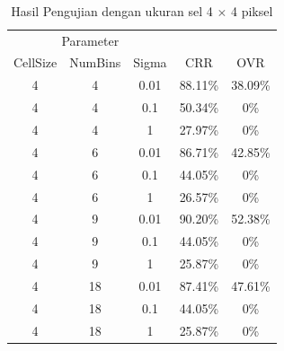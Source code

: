 \\
\\
\\
\\
\\
\\
\\
\\
\begin{longtable}[c]{|c|c|c|c|c|}
	\caption{Hasil Pengujian dengan ukuran sel 4 $\times$ 4 piksel}
	\label{tab:HasilPengujianSel4}\\
	\hline
	\multicolumn{3}{|c|}{Parameter} &                                &                                \\ \cline{1-3}
	CellSize   & NumBins   & Sigma  & \multirow{-2}{*}{CRR}          & \multirow{-2}{*}{OVR}          \\ \hline
	\endhead
	4          & 4         & 0.01   & 88.11\%                        & 38.09\% \\ \hline
	4          & 4         & 0.1    & 50.34\%                        & 0\%                            \\ \hline
	4          & 4         & 1      & 27.97\%                        & 0\%                            \\ \hline
	4          & 6         & 0.01   & 86.71\%                        & 42.85\%                         \\ \hline
	4          & 6         & 0.1    & 44.05\%                        & 0\%                            \\ \hline
	4          & 6         & 1      & 26.57\%                        & 0\%                            \\ \hline
	4          & 9         & 0.01   & {\color[HTML]{FE0000} 90.20\%} & {\color[HTML]{FE0000} 52.38\%} \\ \hline
	4          & 9         & 0.1    & 44.05\%                        & 0\%                            \\ \hline
	4          & 9         & 1      & 25.87\%                        & 0\%                            \\ \hline
	4          & 18        & 0.01   & 87.41\%                        & 47.61\%                         \\ \hline
	4          & 18        & 0.1    & 44.05\%                        & 0\%                            \\ \hline
	4          & 18        & 1      & 25.87\%                        & 0\%                            \\ \hline
\end{longtable}
